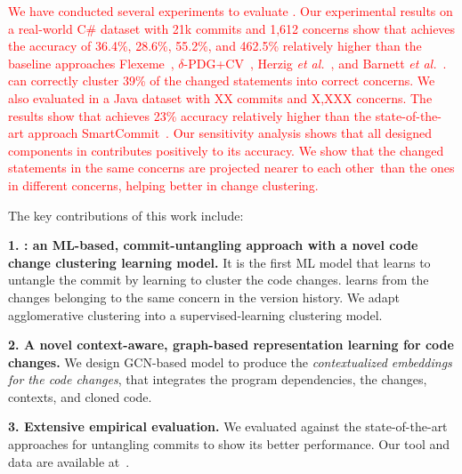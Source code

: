   \textcolor{red}{We have conducted several experiments to evaluate
    {\tool}. Our experimental results on a real-world C\# dataset with
    21k commits and 1,612 concerns show that {\tool} achieves the
    accuracy of 36.4\%, 28.6\%, 55.2\%, and 462.5\% relatively higher
    than the baseline approaches Flexeme~\cite{flexeme-fse20},
    $\delta$-PDG+CV~\cite{flexeme-fse20}, Herzig {\em et
      al.}~\cite{kim-emse16}, and Barnett {\em et
      al.}~\cite{barnett-icse15}. {\tool} can correctly cluster 39\%
    of the changed statements into correct concerns.
%
  We also evaluated {\tool} in a Java dataset with XX commits and
  X,XXX concerns. The results show that {\tool} achieves 23\%
  accuracy relatively higher than the state-of-the-art approach
  SmartCommit~\cite{smartcommit-fse21}. Our sensitivity analysis shows
  that all designed components in {\tool} contributes positively to
  its accuracy. We show that the changed statements in the
  same concerns are projected nearer to each other~than the ones in
  different concerns, helping {\tool} better in change clustering.}

The key contributions of this work include:

{\bf 1. {\tool}: an ML-based, commit-untangling approach with a novel
  code change clustering learning model.} It is the first ML model
that learns to untangle the commit by learning to cluster the code
changes.  {\tool} learns from the changes belonging to the same
concern in the version history. We adapt agglomerative clustering
into a supervised-learning clustering model.

{\bf 2. A novel context-aware, graph-based representation learning for
  code changes.} We design GCN-based model to produce the {\em
  contextualized embeddings for the code changes}, that
integrates the program dependencies, the changes, contexts, and cloned code.

{\bf 3. Extensive empirical evaluation.} We evaluated {\tool} against
the state-of-the-art approaches for untangling commits to show its better
performance. Our tool and data are available at~\cite{utango-website}.


